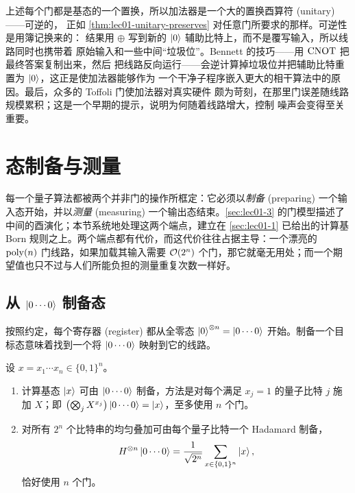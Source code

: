 \begin{remark}
上述每个门都是基态的一个置换，所以加法器是一个大的置换酉算符 (unitary)——可逆的，
正如 \cref{thm:lec01-unitary-preserves} 对任意门所要求的那样。可逆性是用簿记换来的：
结果用 $\oplus$ 写到新的 $\ket{0}$ 辅助比特上，而不是覆写输入，所以线路同时也携带着
原始输入和一些中间``垃圾位''。Bennett 的技巧——用 $\mathrm{CNOT}$ 把最终答案复制出来，然后
把线路反向运行——会逆计算掉垃圾位并把辅助比特重置为 $\ket{0}$，这正是使加法器能够作为
一个干净子程序嵌入更大的相干算法中的原因。最后，众多的 Toffoli 门使加法器对真实硬件
颇为苛刻，在那里门误差随线路规模累积；这是一个早期的提示，说明为何随着线路增大，控制
噪声会变得至关重要。
\end{remark}
\section{态制备与测量}
\label{sec:lec01-prepmeas}

每一个量子算法都被两个并非门的操作所框定：它必须以\emph{制备} (preparing) 一个输入态开始，并以\emph{测量} (measuring) 一个输出态结束。\cref{sec:lec01-3} 的门模型描述了中间的酉演化；本节系统地处理这两个端点，建立在 \cref{sec:lec01-1} 已给出的计算基 Born 规则之上。两个端点都有代价，而这代价往往占据主导：一个漂亮的 $\operatorname{poly}(n)$ 门线路，如果加载其输入需要 $\mathcal{O}(2^{n})$ 个门，那它就毫无用处；而一个期望值也只不过与人们所能负担的测量重复次数一样好。

\subsection{从 \texorpdfstring{$\ket{0\cdots0}$}{|0...0>} 制备态}

按照约定，每个寄存器 (register) 都从全零态 $\ket{0}^{\otimes n}=\ket{0\cdots0}$ 开始。制备一个目标态意味着找到一个将 $\ket{0\cdots0}$ 映射到它的线路。

\begin{proposition}[基态与均匀叠加]\label{prop:lec01-prepbasic}
设 $x=x_{1}\cdots x_{n}\in\{0,1\}^{n}$。
\begin{enumerate}[label=\textup{(\alph*)}]
  \item 计算基态 $\ket{x}$ 可由 $\ket{0\cdots0}$ 制备，方法是对每个满足 $x_{j}=1$ 的量子比特 $j$ 施加 $X$；即
        $\bigl(\bigotimes_{j}X^{x_{j}}\bigr)\ket{0\cdots0}=\ket{x}$，至多使用
        $n$ 个门。
  \item 对所有 $2^{n}$ 个比特串的均匀叠加可由每个量子比特一个 Hadamard 制备，
        \begin{equation}\label{eq:lec01-uniform}
          H^{\otimes n}\ket{0\cdots0}
            =\frac{1}{\sqrt{2^{n}}}\sum_{x\in\{0,1\}^{n}}\ket{x},
        \end{equation}
        恰好使用 $n$ 个门。
\end{enumerate}
\end{proposition}

